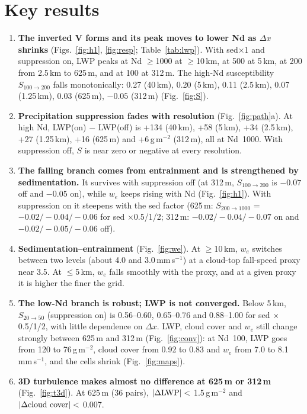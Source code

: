 \documentclass[10pt]{article}
\begin{document}
\section*{Key results}
\begin{enumerate}
\item \textbf{The inverted V forms and its peak moves to lower Nd as $\Delta x$ shrinks} (Figs.~\ref{fig:h1}, \ref{fig:resp}; Table~\ref{tab:lwp}).
With sed$\times$1 and suppression on, LWP peaks at Nd $\geq$1000 at $\geq$10\,km, at 500 at 5\,km, at 200 from 2.5\,km to 625\,m, and at 100 at 312\,m.
The high-Nd susceptibility $S_{100\to200}$ falls monotonically: 0.27 (40\,km), 0.20 (5\,km), 0.11 (2.5\,km), 0.07 (1.25\,km), 0.03 (625\,m), $-0.05$ (312\,m) (Fig.~\ref{fig:S}).
\item \textbf{Precipitation suppression fades with resolution} (Fig.~\ref{fig:path}a). At high Nd, LWP(on) $-$ LWP(off) is +134 (40\,km), +58 (5\,km),
+34 (2.5\,km), +27 (1.25\,km), +16 (625\,m) and +6\,g\,m$^{-2}$ (312\,m), all at Nd~1000. With suppression off, $S$ is near zero or negative at every resolution.
\item \textbf{The falling branch comes from entrainment and is strengthened by sedimentation.} It survives with suppression off
(at 312\,m, $S_{100\to200}$ is $-0.07$ off and $-0.05$ on), while $w_e$ keeps rising with Nd (Fig.~\ref{fig:h1}). With suppression on it steepens with the sed factor
(625\,m: $S_{200\to1000}$ = $-0.02/-0.04/-0.06$ for sed $\times$0.5/1/2; 312\,m: $-0.02/-0.04/-0.07$ on and $-0.02/-0.05/-0.06$ off).
\item \textbf{Sedimentation--entrainment} (Fig.~\ref{fig:we}). At $\geq$10\,km, $w_e$ switches between two levels (about 4.0 and 3.0\,mm\,s$^{-1}$) at a cloud-top
fall-speed proxy near 3.5. At $\leq$5\,km, $w_e$ falls smoothly with the proxy, and at a given proxy it is higher the finer the grid.
\item \textbf{The low-Nd branch is robust; LWP is not converged.} Below 5\,km, $S_{20\to50}$ (suppression on) is 0.56--0.60, 0.65--0.76 and 0.88--1.00 for sed
$\times$0.5/1/2, with little dependence on $\Delta x$. LWP, cloud cover and $w_e$ still change strongly between 625\,m and 312\,m (Fig.~\ref{fig:conv}):
at Nd~100, LWP goes from 120 to 76\,g\,m$^{-2}$, cloud cover from 0.92 to 0.83 and $w_e$ from 7.0 to 8.1\,mm\,s$^{-1}$, and the cells shrink (Fig.~\ref{fig:maps}).
\item \textbf{3D turbulence makes almost no difference at 625\,m or 312\,m} (Fig.~\ref{fig:t3d}). At 625\,m (36 pairs), $|\Delta{\rm LWP}| <$ 1.5\,g\,m$^{-2}$ and $|\Delta{\rm cloud\ cover}| <$ 0.007.

\end{enumerate}
\end{document}
